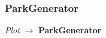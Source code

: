 \subsubsection{ParkGenerator}
\begin{center}
    \textit{Plot} $\rightarrow$ \textbf{ParkGenerator}                        
\end{center}

